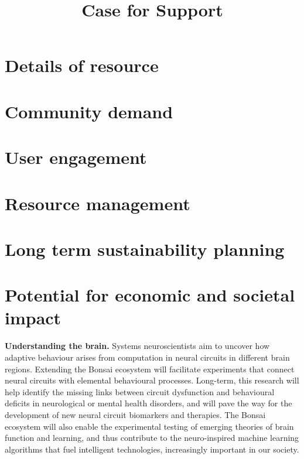 \documentclass[a4paper,11point]{article}
\title{Case for Support}
\author{}
\begin{document}
\maketitle

\tableofcontents
    
\newpage

\setcounter{page}{1}



\section{Details of resource}



\section{Community demand}
\label{sec:communityDemand}



\section{User engagement}
\label{sec:userEngagement}



\section{Resource management}



\section{Long term sustainability planning}

\section{Potential for economic and societal impact}
\textbf{Understanding the brain.} Systems neuroscientists aim to uncover how adaptive behaviour arises
from computation in neural circuits in different brain regions. Extending the Bonsai ecosystem will facilitate experiments that connect neural circuits with elemental behavioural processes. Long-term, this research will help identify the missing links between circuit dysfunction and behavioural deficits in neurological or mental health disorders, and will pave the way for the development of new neural circuit biomarkers and therapies. The Bonsai ecosystem will also enable the experimental testing of emerging theories of brain function and learning, and thus contribute to the neuro-inspired machine learning algorithms that fuel intelligent technologies, increasingly important in our society.
\end{document}
